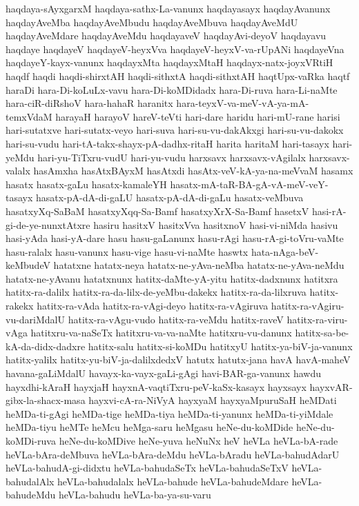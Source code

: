 {haqdaya-sAyxgarxM
haqdaya-sathx-La-vanunx
haqdayasayx
haqdayAvanunx
haqdayAveMba
haqdayAveMbudu
haqdayAveMbuva
haqdayAveMdU
haqdayAveMdare
haqdayAveMdu
haqdayaveV
haqdayAvi-deyoV
haqdayavu
haqdaye
haqdayeV
haqdayeV-heyxVva
haqdayeV-heyxV-va-rUpANi
haqdayeVna
haqdayeY-kayx-vanunx
haqdayxMta
haqdayxMtaH
haqdayx-natx-joyxVRtiH
haqdf
haqdi
haqdi-shirxtAH
haqdi-sithxtA
haqdi-sithxtAH
haqtUpx-vaRka
haqtf
haraDi
hara-Di-koLuLx-vavu
hara-Di-koMDidadx
hara-Di-ruva
hara-Li-naMte
hara-ciR-diRshoV
hara-hahaR
haranitx
hara-teyxV-va-meV-vA-ya-mA-temxVdaM
harayaH
harayoV
hareV-teVti
hari-dare
haridu
hari-mU-rane
harisi
hari-sutatxve
hari-sutatx-veyo
hari-suva
hari-su-vu-dakAkxgi
hari-su-vu-dakokx
hari-su-vudu
hari-tA-takx-shayx-pA-dadhx-ritaH
harita
haritaM
hari-tasayx
hari-yeMdu
hari-yu-TiTxru-vudU
hari-yu-vudu
harxsavx
harxsavx-vAgilalx
harxsavx-valalx
hasAmxha
hasAtxBAyxM
hasAtxdi
hasAtx-veV-kA-ya-na-meVvaM
hasamx
hasatx
hasatx-gaLu
hasatx-kamaleYH
hasatx-mA-taR-BA-gA-vA-meV-veY-tasayx
hasatx-pA-dA-di-gaLU
hasatx-pA-dA-di-gaLu
hasatx-veMbuva
hasatxyXq-SaBaM
hasatxyXqq-Sa-Bamf
hasatxyXrX-Sa-Bamf
hasetxV
hasi-rA-gi-de-ye-nunxtAtxre
hasiru
hasitxV
hasitxVva
hasitxnoV
hasi-vi-niMda
hasivu
hasi-yAda
hasi-yA-dare
hasu
hasu-gaLanunx
hasu-rAgi
hasu-rA-gi-toVru-vaMte
hasu-ralalx
hasu-vanunx
hasu-vige
hasu-vi-naMte
haswtx
hata-nAga-beV-keMbudeV
hatatxne
hatatx-neya
hatatx-ne-yAva-neMba
hatatx-ne-yAva-neMdu
hatatx-ne-yAvanu
hatatxnunx
hatitx-daMte-yA-yitu
hatitx-dadxnunx
hatitxra
hatitx-ra-dalilx
hatitx-ra-da-lilx-de-yeMbu-dakekx
hatitx-ra-da-lilxruva
hatitx-rakekx
hatitx-ra-vAda
hatitx-ra-vAgi-deyo
hatitx-ra-vAgiruva
hatitx-ra-vAgiru-vu-dariMdalU
hatitx-ra-vAgu-vudo
hatitx-ra-veMdu
hatitx-raveV
hatitx-ra-viru-vAga
hatitxru-va-naSeTx
hatitxru-va-va-naMte
hatitxru-vu-danunx
hatitx-sa-be-kA-da-didx-dadxre
hatitx-salu
hatitx-si-koMDu
hatitxyU
hatitx-ya-biV-ja-vanunx
hatitx-yalilx
hatitx-yu-biV-ja-dalilxdedxV
hatutx
hatutx-jana
havA
havA-maheV
havana-gaLiMdalU
havayx-ka-vayx-gaLi-gAgi
havi-BAR-ga-vanunx
hawdu
hayxdhi-kAraH
hayxjaH
hayxnA-vaqtiTxru-peV-kaSx-kasayx
hayxsayx
hayxvAR-gibx-la-shacx-masa
hayxvi-cA-ra-NiVyA
hayxyaM
hayxyaMpuruSaH
heMDati
heMDa-ti-gAgi
heMDa-tige
heMDa-tiya
heMDa-ti-yanunx
heMDa-ti-yiMdale
heMDa-tiyu
heMTe
heMcu
heMga-saru
heMgasu
heNe-du-koMDide
heNe-du-koMDi-ruva
heNe-du-koMDive
heNe-yuva
heNuNx
heV
heVLa
heVLa-bA-rade
heVLa-bAra-deMbuva
heVLa-bAra-deMdu
heVLa-bAradu
heVLa-bahudAdarU
heVLa-bahudA-gi-didxtu
heVLa-bahudaSeTx
heVLa-bahudaSeTxV
heVLa-bahudalAlx
heVLa-bahudalalx
heVLa-bahude
heVLa-bahudeMdare
heVLa-bahudeMdu
heVLa-bahudu
heVLa-ba-ya-su-varu
}
